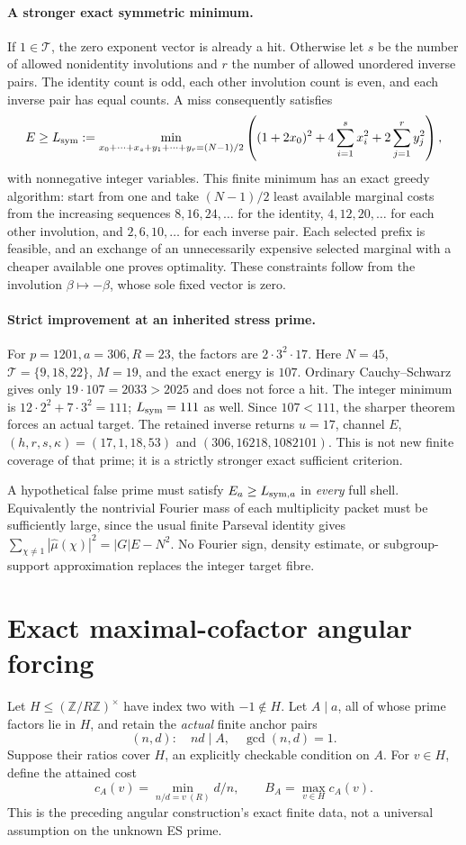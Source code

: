 \documentclass[11pt]{article}
\theoremstyle{definition}\newtheorem{definition}[theorem]{Definition}
\theoremstyle{remark}\newtheorem{remark}[theorem]{Remark}
\newcommand{\Z}{\mathbb Z}\newcommand{\Q}{\mathbb Q}\newcommand{\R}{\mathbb R}
\begin{document}
\paragraph{A stronger exact symmetric minimum.}
If $1\in\mathcal T$, the zero exponent vector is already a hit.
Otherwise let $s$ be the number of allowed nonidentity involutions and
$r$ the number of allowed unordered inverse pairs. The identity count is
odd, each other involution count is even, and each inverse pair has equal
counts. A miss consequently satisfies
\[
 E\ge L_{\rm sym}:=
 \min_{x_0+\cdots+x_s+y_1+\cdots+y_r=(N-1)/2}
 \left((1+2x_0)^2+4\sum_{i=1}^sx_i^2+2\sum_{j=1}^ry_j^2\right),
\]
with nonnegative integer variables. This finite minimum has an exact greedy
algorithm: start from one and take $(N-1)/2$ least available marginal costs
from the increasing sequences $8,16,24,\ldots$ for the identity,
$4,12,20,\ldots$ for each other involution, and $2,6,10,\ldots$ for each
inverse pair. Each selected prefix is feasible, and an exchange of an
unnecessarily expensive selected marginal with a cheaper available one
proves optimality. These constraints follow from the involution
$\beta\mapsto-\beta$, whose sole fixed vector is zero.

\paragraph{Strict improvement at an inherited stress prime.}
For $p=1201,a=306,R=23$, the factors are $2\cdot3^2\cdot17$.
Here $N=45$, $\mathcal T=\{9,18,22\}$, $M=19$, and the exact energy is
$107$. Ordinary Cauchy--Schwarz gives only
$19\cdot107=2033>2025$ and does not force a hit.
The integer minimum is $12\cdot2^2+7\cdot3^2=111$;
$L_{\rm sym}=111$ as well. Since $107<111$, the sharper theorem forces
an actual target. The retained inverse returns $u=17$, channel $E$,
$(h,r,s,\kappa)=(17,1,18,53)$ and
$(306,16218,1082101)$. This is not new finite coverage of that prime;
it is a strictly stronger exact sufficient criterion.

A hypothetical false prime must satisfy $E_a\ge L_{{\rm sym},a}$ in
\emph{every} full shell. Equivalently the nontrivial Fourier mass of each
multiplicity packet must be sufficiently large, since the usual finite
Parseval identity gives
$\sum_{\chi\ne1}|\widehat\mu(\chi)|^2=|G|E-N^2$.
No Fourier sign, density estimate, or subgroup-support approximation
replaces the integer target fibre.

\section{Exact maximal-cofactor angular forcing}
Let $H\le(\Z/R\Z)^\times$ have index two with $-1\notin H$.
Let $A\mid a$, all of whose prime factors lie in $H$, and retain the
\emph{actual} finite anchor pairs
\[
 (n,d):\quad nd\mid A,\quad\gcd(n,d)=1.
\]
Suppose their ratios cover $H$, an explicitly checkable condition on $A$.
For $v\in H$, define the attained cost
\[
 c_A(v)=\min_{n/d=v\ (R)}d/n,
 \qquad B_A=\max_{v\in H}c_A(v).
\]
This is the preceding angular construction's exact finite data, not a
universal assumption on the unknown ES prime.
\end{document}
